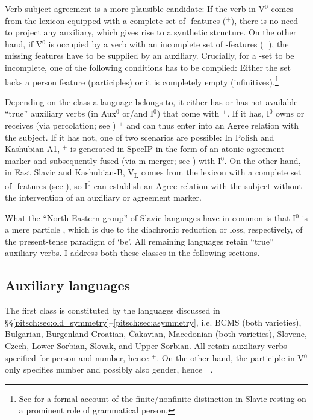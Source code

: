 \documentclass[output=paper]{langscibook}
\begin{document}
Verb-subject agreement is a more plausible candidate: If the verb in V$^0$ comes from the lexicon equipped with a complete set of \textphi-features (\textphi$^+$), there is no need to project any auxiliary, which gives rise to a synthetic structure. On the other hand, if V$^0$ is occupied by a verb with an incomplete set of \textphi-features (\textphi$^-$), the missing features have to be supplied by an auxiliary. Crucially, for a \textphi-set to be incomplete, one of the following conditions has to be complied: Either the set lacks a person feature (participles) or it is completely empty (infinitives).\footnote{See \citet{Pitsch2015} for a formal account of the finite/nonfinite distinction in Slavic resting on a prominent role of grammatical person.}

Depending on the class a language belongs to, it either has or has not available ``true'' auxiliary verbs (in Aux$^0$ or/and I$^0$) that come with \textphi$^+$. If it has, I$^0$ owns or receives (via percolation; see \citealt{Pietraszko2018}) \textphi$^+$ and can thus enter into an Agree relation with the subject. If it has not, one of two scenarios are possible: In Polish and Kashubian-A1, \textphi$^+$ is generated in SpecIP in the form of an atonic agreement marker and subsequently fused (via m-merger; see \citealt{Matushansky2006}) with I$^0$. On the other hand, in East Slavic and Kashubian-B, V\textsubscript{L} comes from the lexicon with a complete set of \textphi-features (see ), so I$^0$ can establish an Agree relation with the subject without the intervention of an auxiliary or agreement marker. 

What the ``North-Eastern group'' of Slavic languages have in common is that I$^0$ is a mere particle \citep{Garde1964}, which is due to the diachronic reduction or loss, respectively, of the present-tense paradigm of `be'. All remaining languages retain ``true'' auxiliary verbs. I address both these classes in the following sections.


\subsection{Auxiliary languages}

The first class is constituted by the languages discussed in §§\ref{pitsch:sec:old_symmetry}--\ref{pitsch:sec:asymmetry}, i.e. BCMS (both varieties), Bulgarian, Burgenland Croatian, Čakavian, Macedonian (both varieties), Slovene, Czech, Lower Sorbian, Slovak, and Upper Sorbian. All retain auxiliary verbs specified for person and number, hence \textphi$^+$. On the other hand, the participle in V$^0$ only specifies number and possibly also gender, hence \textphi$^-$.
\end{document}
